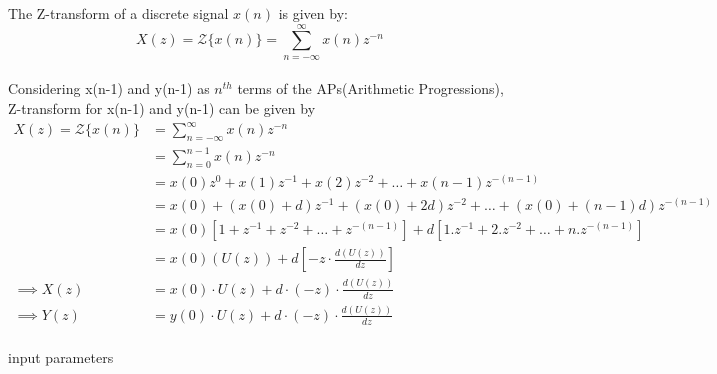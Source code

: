 \documentclass[journal,12pt,onecolumn]{IEEEtran}
\theoremstyle{remark}
\begin{document}
The Z-transform of a discrete signal $x(n)$ is given by:
\[ X(z) = \mathcal{Z}\{x(n)\} = \sum_{n=-\infty}^{\infty} x(n)z^{-n} \]
\\ Considering x(n-1) and y(n-1) as $n^{th}$ terms of the APs(Arithmetic Progressions), Z-transform for x(n-1) and y(n-1) can be given by
\begin{align}
X(z) = \mathcal{Z}\{x(n)\} 
&= \sum_{n=-\infty}^{\infty} x(n)z^{-n} \\
&=\sum_{n=0}^{n-1}x(n)z^{-n} \\
&=x(0)z^{0}+x(1)z^{-1}+x(2)z^{-2}+ \ldots +x(n-1)z^{-(n-1)} \\
&=x(0)+(x(0)+d)z^{-1}+(x(0)+2d)z^{-2}+ \ldots +(x(0)+(n-1)d)z^{-(n-1)} \\
&=x(0)[1+ z^{-1} + z^{-2} + \ldots + z^{-(n-1)}] + d[1.z^{-1}+2.z^{-2}+\ldots+n.z^{-(n-1)}] \\
&=x(0)(U(z)) + d[-z \cdot \frac {d(U(z))}{dz}] \\
\implies X(z) &= x(0)\cdot U(z) + d\cdot{(-z)} \cdot \frac {d(U(z))}{dz}   \\
\implies Y(z) &= y(0)\cdot U(z) + d\cdot{(-z)} \cdot \frac {d(U(z))}{dz}  \\
\end{align}
\begin{table}[!ht]
    \centering
    
    
    \caption{input parameters}
    \label{tab:10_5_3_12}
\end{table}
\end{document}
